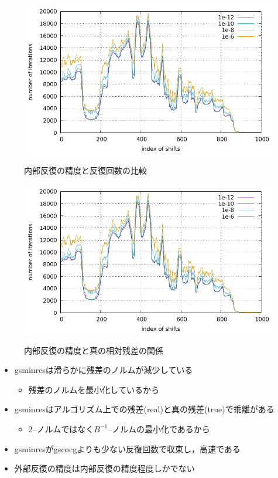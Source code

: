 \begin{figure}[H]
	\begin{center}
		\begin{minipage}[t]{0.49\columnwidth}
			\centering
			\colorbox{white}{ \includegraphics[scale=1.5, page=1]{./fig/compare-inner.pdf} }
			\caption{内部反復の精度と反復回数の比較}
			\label{fig-compare-inner-itr}
		\end{minipage}
		\begin{minipage}[t]{0.49\columnwidth}
			\centering
			\colorbox{white}{ \includegraphics[scale=1.5, page=2]{./fig/compare-inner.pdf} }
			\caption{内部反復の精度と真の相対残差の関係}
			\label{fig-compare-inner-res}
		\end{minipage}
	\end{center}
\end{figure}

\begin{itemize}
	\item gsminresは滑らかに残差のノルムが減少している
		\begin{itemize}
			\item 残差のノルムを最小化しているから
		\end{itemize}
	\item gsminresはアルゴリズム上での残差(real)と真の残差(true)で乖離がある
		\begin{itemize}
			\item $2$--ノルムではなく$B^{-1}$--ノルムの最小化であるから
		\end{itemize}
	\item gsminresがgscocgよりも少ない反復回数で収束し，高速である
	\item 外部反復の精度は内部反復の精度程度しかでない
\end{itemize}



